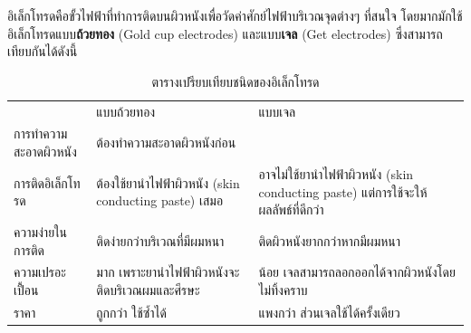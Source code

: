 อิเล็กโทรดคือขั้วไฟฟ้าที่ทำการติดบนผิวหนังเพื่อวัดค่าศักย์ไฟฟ้าบริเวณจุดต่างๆ ที่สนใจ โดยมากมักใช้อิเล็กโทรดแบบ\textbf{ถ้วยทอง}
(Gold cup electrodes) และแบบ\textbf{เจล} (Get electrodes) ซึ่งสามารถเทียบกันได้ดังนี้

\begin{table}[H]
    \begin{tabularx}{\textwidth}{l|X|X}
         & แบบถ้วยทอง & แบบเจล\\
        \hhline{===}
        การทำความสะอาดผิวหนัง  & \multicolumn{2}{l}{ต้องทำความสะอาดผิวหนังก่อน}\\
        \hline
        การติดอิเล็กโทรด & ต้องใช้ยานำไฟฟ้าผิวหนัง (skin conducting paste) เสมอ  & อาจไม่ใช้ยานำไฟฟ้าผิวหนัง (skin conducting paste) แต่การใช้จะให้ผลลัพธ์ที่ดีกว่า \\
        \hline
        ความง่ายในการติด & ติดง่ายกว่าบริเวณที่มีผมหนา & ติดผิวหนังยากกว่าหากมีผมหนา\\
        \hline
        ความเปรอะเปื้อน & มาก เพราะยานำไฟฟ้าผิวหนังจะติดบริเวณผมและศีรษะ & น้อย เจลสามารถลอกออกได้จากผิวหนังโดยไม่ทิ้งคราบ\\
        \hline
        ราคา & ถูกกว่า ใช้ซ้ำได้ & แพงกว่า ส่วนเจลใช้ได้ครั้งเดียว\\
    \end{tabularx}
    \caption{ตารางเปรียบเทียบชนิดของอิเล็กโทรด}
\end{table}
